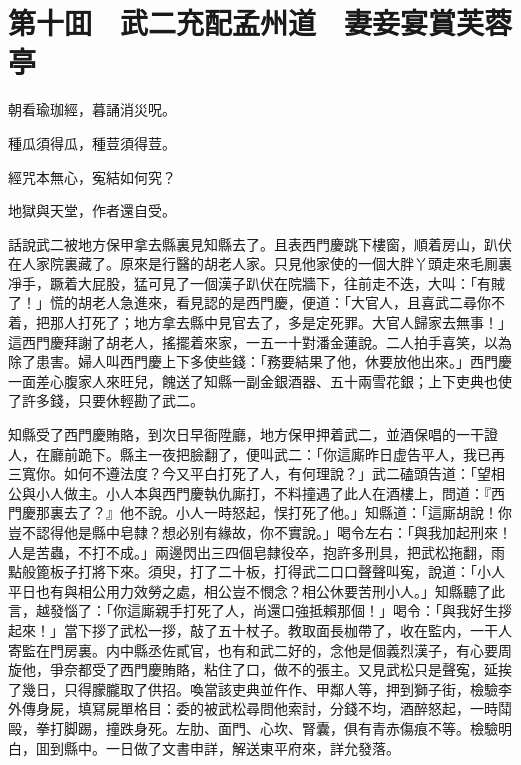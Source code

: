 
\chapter*{第十囬　武二充配孟州道　妻妾宴賞芙蓉亭}

朝看瑜珈經，暮誦消災呪。

種瓜須得瓜，種荳須得荳。

經咒本無心，寃結如何究？

地獄與天堂，作者還自受。

話說武二被地方保甲拿去縣裏見知縣去了。且表西門慶跳下樓窗，順着房山，趴伏在人家院裏藏了。原來是行醫的胡老人家。只見他家使的一個大胖丫頭走來毛厠裏凈手，蹶着大屁股，猛可見了一個漢子趴伏在院牆下，往前走不迭，大叫：「有賊了！」慌的胡老人急進來，看見認的是西門慶，便道：「大官人，且喜武二尋你不着，把那人打死了；地方拿去縣中見官去了，多是定死罪。大官人歸家去無事！」這西門慶拜謝了胡老人，搖擺着來家，一五一十對潘金蓮說。二人拍手喜笑，以為除了患害。婦人叫西門慶上下多使些錢：「務要結果了他，休要放他出來。」西門慶一面差心腹家人來旺兒，餽送了知縣一副金銀酒器、五十兩雪花銀；上下吏典也使了許多錢，只要休輕勘了武二。

知縣受了西門慶賄賂，到次日早衙陞廳，地方保甲押着武二，並酒保唱的一干證人，在廳前跪下。縣主一夜把臉翻了，便叫武二：「你這廝昨日虚告平人，我已再三寬你。如何不遵法度？今又平白打死了人，有何理說？」武二磕頭告道：「望相公與小人做主。小人本與西門慶執仇廝打，不料撞遇了此人在酒樓上，問道：『西門慶那裏去了？』他不說。小人一時怒起，悮打死了他。」知縣道：「這廝胡說！你豈不認得他是縣中皂隸？想必别有緣故，你不實說。」喝令左右：「與我加起刑來！人是苦蟲，不打不成。」兩邊閃出三四個皂隸役卒，抱許多刑具，把武松拖翻，雨點般篦板子打將下來。須臾，打了二十板，打得武二口口聲聲叫寃，說道：「小人平日也有與相公用力效勞之處，相公豈不憫念？相公休要苦刑小人。」知縣聽了此言，越發惱了：「你這廝親手打死了人，尚還口強抵賴那個！」喝令：「與我好生拶起來！」當下拶了武松一拶，敲了五十杖子。教取面長枷帶了，收在監内，一干人寄監在門房裏。内中縣丞佐貳官，也有和武二好的，念他是個義烈漢子，有心要周旋他，爭奈都受了西門慶賄賂，粘住了口，做不的張主。又見武松只是聲寃，延挨了幾日，只得朦朧取了供招。喚當該吏典並仵作、甲鄰人等，押到獅子街，檢驗李外傳身屍，填冩屍單格目：委的被武松尋問他索討，分錢不均，酒醉怒起，一時鬦毆，拳打脚踢，撞跌身死。左肋、面門、心坎、腎囊，俱有青赤傷痕不等。檢驗明白，囬到縣中。一日做了文書申詳，解送東平府來，詳允發落。


